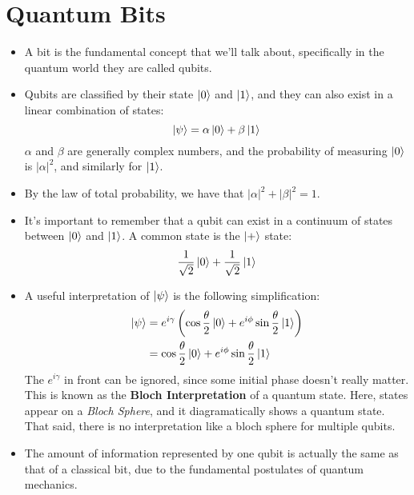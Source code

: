 \section{Quantum Bits}
\begin{itemize}
	\item A bit is the fundamental concept that we'll talk about, specifically in the quantum world they are 
		called qubits. 
	\item Qubits are classified by their state \( \ket 0  \) and \( \ket 1 \), and they can also exist 
		in a linear combination of states: 
		\[
		\ket \psi = \alpha \ket 0 + \beta \ket 1
		\] 
		\( \alpha \) and \( \beta \) are generally complex numbers, and the probability of 
		measuring \( \ket 0 \) is \( |\alpha|^2 \), and similarly for \( \ket 1 \). 
	\item By the law of total  
		probability, we have that \( |\alpha|^2 + |\beta|^2 = 1 \). 
	\item It's important to remember that a qubit can exist in a continuum of states between \( \ket 0 \) and 
		\( \ket 1   \). A common state is the \( \ket + \) state:
		\[
		\frac{1}{\sqrt{2} }\ket 0 + \frac{1}{\sqrt{2} }\ket 1
		\] 
	\item A useful interpretation of \( \ket \psi \) is the following simplification:
		\begin{align*}
			\ket \psi &=  e^{i \gamma} \left( \cos \frac{\theta}{2}\ket 0 + e^{i\phi} \sin \frac{\theta}{2} \ket 1 \right) \\
			&= \cos \frac{\theta}{2} \ket 0  + e^{i\phi}\sin \frac{\theta}{2} \ket 1
		\end{align*}
		The \( e^{i\gamma} \) in front can be ignored, since some initial phase doesn't really matter. This is 
		known as the \textbf{Bloch Interpretation} of a quantum state. Here, states appear on a 
		\textit{Bloch Sphere}, and it diagramatically shows a quantum state. That said, there is 
		no interpretation like a bloch sphere for multiple qubits. 
	\item The amount of information represented by one qubit is actually the same as that of a classical 
		bit, due to the fundamental postulates of quantum mechanics.
\end{itemize}

